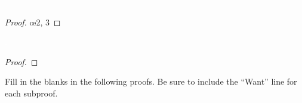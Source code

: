 \begin{exercises}
\item  \textcolor{white}{.} %
\vspace{-16pt}
\begin{proof}
  
\open
{} 
 \oe{2, 3}
\close
{} 
\end{proof}


\item  \textcolor{white}{.} \\ %
\vspace{-16pt}
\begin{proof}
 
	\open
	 
	 
	\close
	\open
	 
	 
	 
	\close
{} 
\end{proof}
\end{exercises}

 
\noindent\problempart Fill in the blanks in the following proofs. Be sure to include the ``Want'' line for each subproof. 

